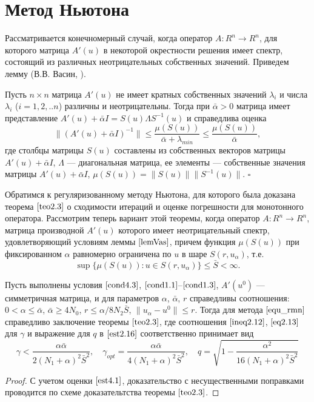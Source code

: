 \section{Метод Ньютона}
Рассматривается конечномерный случай, когда оператор $A\colon R^n \to R^n$, для которого матрица $A'(u)$ в некоторой окрестности решения имеет спектр, состоящий из различных неотрицательных собственных значений.
Приведем лемму (В.В. Васин, \cite{VasSkur2017}).
\begin{lemma}\label{lemVas}
	Пусть $n\times n$ матрица $A'(u)$ не имеет кратных собственных значений $\lambda _i$ и числа $\lambda _i$ ($i=1,2,..n$) различны и неотрицательны. Тогда при $\bar\alpha>0$ матрица имеет представление $A'(u)+\bar\alpha I =S(u)\Lambda S^{-1}(u)$ и справедлива оценка
	\begin{equation}\label{est4.1}
	\|(A'(u)+\bar\alpha I)^{-1}\|\le \frac{\mu (S(u))}{\bar\alpha+\lambda_{min}} \le \frac{\mu(S(u))}{\bar\alpha},
	\end{equation}
	где столбцы матрицы $S(u)$ составлены из собственных векторов матрицы $A'(u)+\bar\alpha I$, $\Lambda$ --- диагональная матрица, ее элементы --- собственные значения матрицы $A'(u)+\bar\alpha I$, $\mu(S(u))=\|S(u)\|\|S^{-1}(u)\|$. $\square$
\end{lemma}
Обратимся к регуляризованному методу Ньютона, для которого была доказана теорема $\ref{teo2.3}$ о сходимости итераций и оценке погрешности для монотонного оператора. Рассмотрим теперь вариант этой теоремы, когда оператор $A\colon R^n \to R^n$, матрица производной $A'(u)$ которого имеет неотрицательный спектр, удовлетворяющий условиям леммы $\ref{lemVas}$, причем функция $\mu(S(u))$ при фиксированном $\alpha$ равномерно ограничена по $u$ в шаре $S(r, u_\alpha)$, т.е.
\begin{equation}\label{cond4.3}
\sup\{\mu(S(u)): u\in S(r, u_\alpha)\}\le\bar S <\infty .
\end{equation}
\begin{theorem}\label{teo4.1}
	Пусть выполнены условия $\eqref{cond4.3}$, $\eqref{cond1.1}$--$\eqref{cond1.3}$, $A'(u^0)$ --- симметричная матрица, и для параметров $\alpha$, $\bar{\alpha}$, $r$ справедливы соотношения: $0<\alpha\le\bar\alpha$, $\bar\alpha\ge 4N_0$, $r\le\alpha/8N_2\bar S$, $\|u_\alpha-u^0\|\le r$.
	Тогда для метода $\eqref{equ_rmn}$ справедливо заключение теоремы $\ref{teo2.3}$, где соотношения $\eqref{ineq2.12}$, $\eqref{eq2.13}$ для $\gamma$ и выражение для $q$ в $\eqref{est2.16}$ соответственно принимает вид
	$$\gamma < \frac{\alpha\bar\alpha}{2(N_1+\alpha)^2\bar S^2}, \quad \gamma _{opt}=\frac{\alpha\bar\alpha}{4(N_1+\alpha)^2\bar S^2}, \quad q=\sqrt{1-\frac{\alpha ^2}{16(N_1+\alpha)^2\bar S^2}}$$
\end{theorem}
\begin{proof} С учетом оценки $\eqref{est4.1}$, доказательство с несущественными поправками проводится по схеме доказательтства теоремы $\ref{teo2.3}$.
\end{proof}

